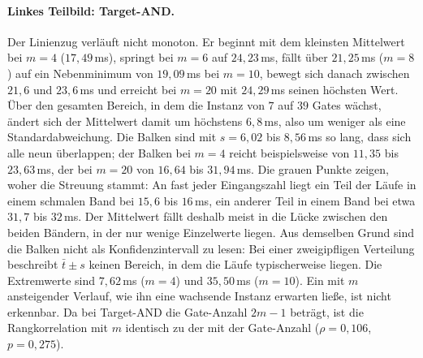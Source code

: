 \documentclass[a4paper,12pt]{article}
\theoremstyle{definition}
\begin{document}
\paragraph{Linkes Teilbild: Target-AND.} Der Linienzug verläuft nicht monoton. Er beginnt mit dem kleinsten Mittelwert bei $m = 4$ ($17{,}49$\,ms), springt bei $m = 6$ auf $24{,}23$\,ms, fällt über $21{,}25$\,ms ($m = 8$) auf ein Nebenminimum von $19{,}09$\,ms bei $m = 10$, bewegt sich danach zwischen $21{,}6$ und $23{,}6$\,ms und erreicht bei $m = 20$ mit $24{,}29$\,ms seinen höchsten Wert. Über den gesamten Bereich, in dem die Instanz von $7$ auf $39$ Gates wächst, ändert sich der Mittelwert damit um höchstens $6{,}8$\,ms, also um weniger als eine Standardabweichung. Die Balken sind mit $s = 6{,}02$ bis $8{,}56$\,ms so lang, dass sich alle neun überlappen; der Balken bei $m = 4$ reicht beispielsweise von $11{,}35$ bis $23{,}63$\,ms, der bei $m = 20$ von $16{,}64$ bis $31{,}94$\,ms. Die grauen Punkte zeigen, woher die Streuung stammt: An fast jeder Eingangszahl liegt ein Teil der Läufe in einem schmalen Band bei $15{,}6$ bis $16$\,ms, ein anderer Teil in einem Band bei etwa $31{,}7$ bis $32$\,ms. Der Mittelwert fällt deshalb meist in die Lücke zwischen den beiden Bändern, in der nur wenige Einzelwerte liegen. Aus demselben Grund sind die Balken nicht als Konfidenzintervall zu lesen: Bei einer zweigipfligen Verteilung beschreibt $\bar{t} \pm s$ keinen Bereich, in dem die Läufe typischerweise liegen. Die Extremwerte sind $7{,}62$\,ms ($m = 4$) und $35{,}50$\,ms ($m = 10$). Ein mit $m$ ansteigender Verlauf, wie ihn eine wachsende Instanz erwarten ließe, ist nicht erkennbar. Da bei Target-AND die Gate-Anzahl $2m-1$ beträgt, ist die Rangkorrelation mit $m$ identisch zu der mit der Gate-Anzahl ($\rho = 0{,}106$, $p = 0{,}275$).
\end{document}
